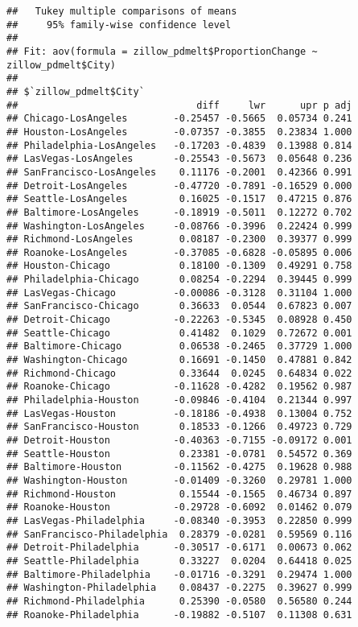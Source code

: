 \documentclass[
]{article}
\begin{document}
\begin{verbatim}
##   Tukey multiple comparisons of means
##     95% family-wise confidence level
## 
## Fit: aov(formula = zillow_pdmelt$ProportionChange ~ zillow_pdmelt$City)
## 
## $`zillow_pdmelt$City`
##                               diff     lwr      upr p adj
## Chicago-LosAngeles        -0.25457 -0.5665  0.05734 0.241
## Houston-LosAngeles        -0.07357 -0.3855  0.23834 1.000
## Philadelphia-LosAngeles   -0.17203 -0.4839  0.13988 0.814
## LasVegas-LosAngeles       -0.25543 -0.5673  0.05648 0.236
## SanFrancisco-LosAngeles    0.11176 -0.2001  0.42366 0.991
## Detroit-LosAngeles        -0.47720 -0.7891 -0.16529 0.000
## Seattle-LosAngeles         0.16025 -0.1517  0.47215 0.876
## Baltimore-LosAngeles      -0.18919 -0.5011  0.12272 0.702
## Washington-LosAngeles     -0.08766 -0.3996  0.22424 0.999
## Richmond-LosAngeles        0.08187 -0.2300  0.39377 0.999
## Roanoke-LosAngeles        -0.37085 -0.6828 -0.05895 0.006
## Houston-Chicago            0.18100 -0.1309  0.49291 0.758
## Philadelphia-Chicago       0.08254 -0.2294  0.39445 0.999
## LasVegas-Chicago          -0.00086 -0.3128  0.31104 1.000
## SanFrancisco-Chicago       0.36633  0.0544  0.67823 0.007
## Detroit-Chicago           -0.22263 -0.5345  0.08928 0.450
## Seattle-Chicago            0.41482  0.1029  0.72672 0.001
## Baltimore-Chicago          0.06538 -0.2465  0.37729 1.000
## Washington-Chicago         0.16691 -0.1450  0.47881 0.842
## Richmond-Chicago           0.33644  0.0245  0.64834 0.022
## Roanoke-Chicago           -0.11628 -0.4282  0.19562 0.987
## Philadelphia-Houston      -0.09846 -0.4104  0.21344 0.997
## LasVegas-Houston          -0.18186 -0.4938  0.13004 0.752
## SanFrancisco-Houston       0.18533 -0.1266  0.49723 0.729
## Detroit-Houston           -0.40363 -0.7155 -0.09172 0.001
## Seattle-Houston            0.23381 -0.0781  0.54572 0.369
## Baltimore-Houston         -0.11562 -0.4275  0.19628 0.988
## Washington-Houston        -0.01409 -0.3260  0.29781 1.000
## Richmond-Houston           0.15544 -0.1565  0.46734 0.897
## Roanoke-Houston           -0.29728 -0.6092  0.01462 0.079
## LasVegas-Philadelphia     -0.08340 -0.3953  0.22850 0.999
## SanFrancisco-Philadelphia  0.28379 -0.0281  0.59569 0.116
## Detroit-Philadelphia      -0.30517 -0.6171  0.00673 0.062
## Seattle-Philadelphia       0.33227  0.0204  0.64418 0.025
## Baltimore-Philadelphia    -0.01716 -0.3291  0.29474 1.000
## Washington-Philadelphia    0.08437 -0.2275  0.39627 0.999
## Richmond-Philadelphia      0.25390 -0.0580  0.56580 0.244
## Roanoke-Philadelphia      -0.19882 -0.5107  0.11308 0.631

\end{verbatim}
\end{document}
